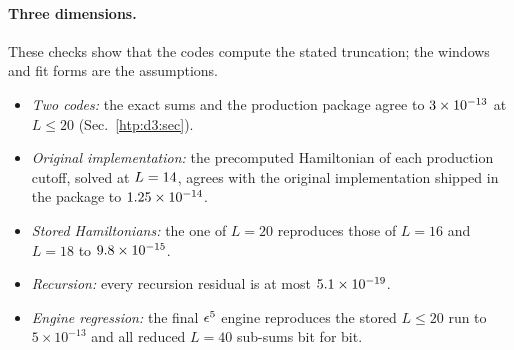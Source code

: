 \paragraph{Three dimensions.}\label{htp:d3:checks}
These checks show that the codes compute the stated truncation; the windows and fit forms are the assumptions.
\begin{itemize}
\item \emph{Two codes:} the exact sums and the production package agree to $3\times10^{-13}$ at $L\le20$
 (Sec.~\ref{htp:d3:sec}).
\item \emph{Original implementation:} the precomputed Hamiltonian of each production cutoff, solved at
 $L=14$, agrees with the original implementation shipped in the package to $1.25\times10^{-14}$.
\item \emph{Stored Hamiltonians:} the one of $L=20$ reproduces those of $L=16$ and $L=18$ to $9.8\times10^{-15}$.
\item \emph{Recursion:} every recursion residual is at most $5.1\times10^{-19}$.
\item \emph{Engine regression:} the final $\epsilon^5$ engine reproduces the stored $L\le20$ run to $5\times10^{-13}$ and all
 reduced $L=40$ sub-sums bit for bit.
\end{itemize}
